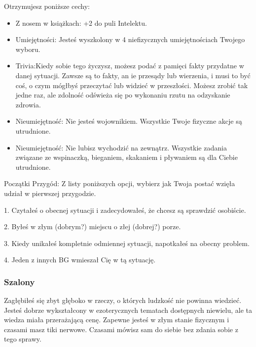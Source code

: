 Otrzymujesz poniższe cechy:
\begin{itemize}
    \item  Z nosem w książkach: +2 do puli Intelektu.
    \item  Umiejętności: Jesteś wyszkolony w 4 niefizycznych umiejętnościach Twojego wyboru.
    \item  Trivia:Kiedy sobie tego życzysz, możesz podać z pamięci fakty przydatne w danej sytuacji. Zawsze są to fakty, an ie przesądy lub wierzenia, i musi to być coś, o czym mógłbyś przeczytać lub widzieć w przeszłości. Możesz zrobić tak jedne raz, ale zdolność odświeża się po wykonaniu rzutu na odzyskanie zdrowia.
    \item Nieumiejętność: Nie jesteś wojownikiem. Wszystkie Twoje fizyczne akcje są utrudnione. 
    \item Nieumiejętność: Nie lubisz wychodzić na zewnątrz. Wszystkie zadania związane ze wspinaczką, bieganiem, skakaniem i pływaniem są dla Ciebie utrudnione.
\end{itemize}

Początki Przygód: Z listy poniższych opcji, wybierz jak Twoja postać wzięła udział w pierwszej przygodzie.

1. Czytałeś o obecnej sytuacji i zadecydowałeś, że chcesz są sprawdzić osobiście.

2. Byłeś w złym (dobrym?) miejscu o złej (dobrej?) porze.

3. Kiedy unikałeś kompletnie odmiennej sytuacji, napotkałeś na obecny problem.

4. Jeden z innych BG wmieszał Cię w tą sytuację.

\subsubsection{Szalony}

Zagłębiłeś się zbyt głęboko w rzeczy, o których ludzkość nie powinna wiedzieć. Jesteś dobrze wykształcony w ezoterycznych tematach dostępnych niewielu, ale ta wiedza miała przerażającą cenę. Zapewne jesteś w złym stanie fizycznym i czasami masz tiki nerwowe. Czasami mówisz sam do siebie bez zdania sobie z tego sprawy.

